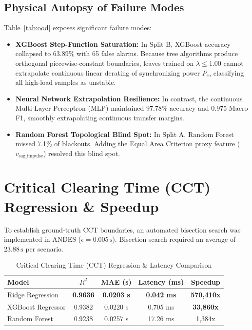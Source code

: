 \documentclass[journal]{IEEEtran}
\begin{document}
\subsection{Physical Autopsy of Failure Modes}
Table~\ref{tab:ood} exposes significant failure modes:
\begin{itemize}
    \item \textbf{XGBoost Step-Function Saturation:} In Split B, XGBoost accuracy collapsed to 63.89\% with 65 false alarms. Because tree algorithms produce orthogonal piecewise-constant boundaries, leaves trained on $\lambda \le 1.00$ cannot extrapolate continuous linear derating of synchronizing power $P_e$, classifying all high-load samples as unstable.
    \item \textbf{Neural Network Extrapolation Resilience:} In contrast, the continuous Multi-Layer Perceptron (MLP) maintained 97.78\% accuracy and 0.975 Macro F1, smoothly extrapolating continuous transfer margins.
    \item \textbf{Random Forest Topological Blind Spot:} In Split A, Random Forest missed 7.1\% of blackouts. Adding the Equal Area Criterion proxy feature ($v_{\text{sag\_impulse}}$) resolved this blind spot.
\end{itemize}

\section{Critical Clearing Time (CCT) Regression \& Speedup}
To establish ground-truth CCT boundaries, an automated bisection search was implemented in ANDES ($\epsilon = 0.005\,\text{s}$). Bisection search required an average of $23.88\,\text{s}$ per scenario.

\begin{table}[htbp]
\centering
\caption{Critical Clearing Time (CCT) Regression \& Latency Comparison}
\label{tab:cct}
\setlength{\tabcolsep}{3.5pt}
\begin{tabular}{lcccc}
\toprule
\textbf{Model} & $R^2$ & \textbf{MAE (s)} & \textbf{Latency (ms)} & \textbf{Speedup} \\
\midrule
Ridge Regression & \textbf{0.9636} & \textbf{0.0203 s} & \textbf{0.042 ms} & \textbf{570,410x} \\
XGBoost Regressor & 0.9382 & 0.0220 s & 0.705 ms & \textbf{33,860x} \\
Random Forest & 0.9238 & 0.0257 s & 17.26 ms & 1,384x \\
\bottomrule
\end{tabular}
\end{table}
\end{document}

